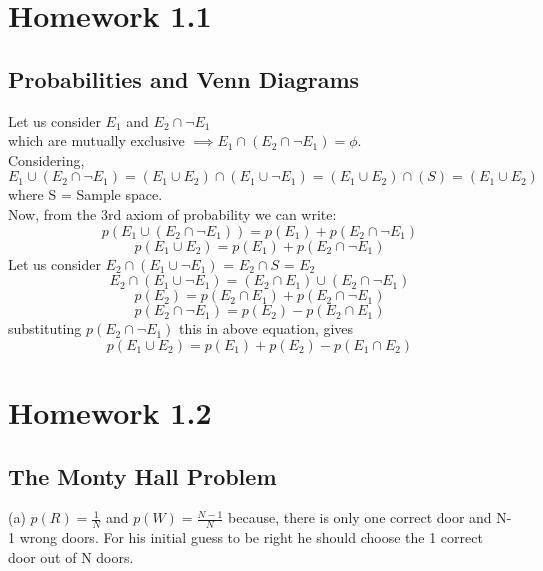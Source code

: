 \documentclass[11pt, a4paper]{article}
\begin{document}
 
    



%
\tableofcontents

\clearpage
    
\section{Homework 1.1}
\label{sec:1.1} 
\subsection*{Probabilities and Venn Diagrams}
Let us consider \(E_1\) and \(E_2 \cap \neg E_1\) \\ \vspace*{0.4 cm}
which are mutually exclusive \( \implies E_1 \cap (E_2 \cap \neg E_1) = \phi\). \\ \vspace*{0.4 cm}
Considering,
\[
    E_1 \cup (E_2 \cap \neg E_1)   = (E_1 \cup E_2) \cap (E_1 \cup \neg E_1) = (E_1 \cup E_2) \cap (S) = (E_1 \cup E_2)
\]
where S = Sample space.\\ \vspace*{0.4 cm}
Now, from the 3rd axiom of probability we can write:
\[
    p(E_1 \cup (E_2 \cap \neg E_1)) = p(E_1) + p(E_2 \cap \neg E_1)
\]
\[
    p(E_1 \cup E_2) = p(E_1) + p(E_2 \cap \neg E_1)
\]
Let us consider \(E_2 \cap (E_1 \cup \neg E_1)\) = \(E_2 \cap S\) = \(E_2\)  
\[
    E_2 \cap (E_1 \cup \neg E_1) = (E_2 \cap E_1) \cup (E_2 \cap \neg E_1)
\]
\[
    p(E_2) = p(E_2 \cap E_1) + p(E_2 \cap \neg E_1)  
\]
\[
    p(E_2 \cap \neg E_1)  =  p(E_2) - p(E_2 \cap E_1)
\] 
substituting \( p(E_2 \cap \neg E_1)\)  this in above equation, gives
\[
    p(E_1 \cup E_2) = p(E_1) + p(E_2) - p(E_1 \cap E_2)
\]
\section{Homework 1.2}
\label{sec:1.2}
\subsection*{The Monty Hall Problem}
(a) \(p(R) = \frac{1}{N}\) and \(p(W) = \frac{N-1}{N}\) because, there is only one correct door and N-1 wrong doors. For his initial guess to be right he should choose the 1 correct door out of N doors.
\end{document}
